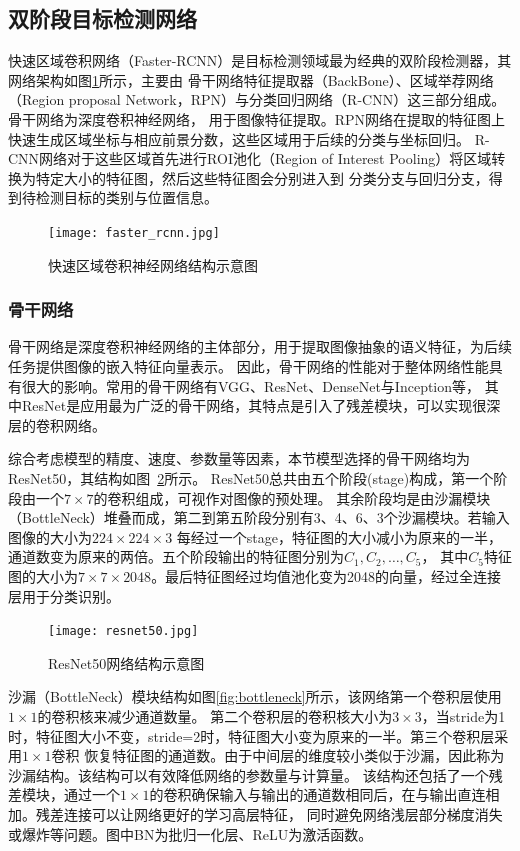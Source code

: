 \subsection{双阶段目标检测网络}
\label{section:faster-rcnn}
快速区域卷积网络（Faster-RCNN）是目标检测领域最为经典的双阶段检测器，其网络架构如图\ref{fig:faster_rcnn}所示，主要由
骨干网络特征提取器（BackBone）、区域举荐网络（Region proposal Network，RPN）与分类回归网络（R-CNN）这三部分组成。骨干网络为深度卷积神经网络，
用于图像特征提取。RPN网络在提取的特征图上快速生成区域坐标与相应前景分数，这些区域用于后续的分类与坐标回归。
R-CNN网络对于这些区域首先进行ROI池化（Region of Interest Pooling）将区域转换为特定大小的特征图，然后这些特征图会分别进入到
分类分支与回归分支，得到待检测目标的类别与位置信息。

\begin{figure}  
   \centering   
   \texttt{[image: faster\_rcnn.jpg]}   
   \caption{快速区域卷积神经网络结构示意图}   
   \label{fig:faster_rcnn} 
\end{figure}  

\subsubsection{骨干网络}
骨干网络是深度卷积神经网络的主体部分，用于提取图像抽象的语义特征，为后续任务提供图像的嵌入特征向量表示。
因此，骨干网络的性能对于整体网络性能具有很大的影响。常用的骨干网络有VGG、ResNet、DenseNet与Inception等，
其中ResNet是应用最为广泛的骨干网络，其特点是引入了残差模块，可以实现很深层的卷积网络。

综合考虑模型的精度、速度、参数量等因素，本节模型选择的骨干网络均为ResNet50，其结构如图~\ref{fig:resnet50}所示。
ResNet50总共由五个阶段(stage)构成，第一个阶段由一个$7\times7$的卷积组成，可视作对图像的预处理。
其余阶段均是由沙漏模块（BottleNeck）堆叠而成，第二到第五阶段分别有3、4、6、3个沙漏模块。若输入图像的大小为$224\times224\times3$
每经过一个stage，特征图的大小减小为原来的一半，通道数变为原来的两倍。五个阶段输出的特征图分别为$C_1, C_2, \dots, C_5$，
其中$C_5$特征图的大小为$7\times7\times2048$。最后特征图经过均值池化变为2048的向量，经过全连接层用于分类识别。

\begin{figure}      
  \centering       
  \texttt{[image: resnet50.jpg]}       
  \caption{ResNet50网络结构示意图}       
  \label{fig:resnet50}  
\end{figure}   

沙漏（BottleNeck）模块结构如图\ref{fig:bottleneck}所示，该网络第一个卷积层使用$1\times1$的卷积核来减少通道数量。
第二个卷积层的卷积核大小为$3\times3$，当stride为1时，特征图大小不变，stride=2时，特征图大小变为原来的一半。第三个卷积层采用$1\times1$卷积
恢复特征图的通道数。由于中间层的维度较小类似于沙漏，因此称为沙漏结构。该结构可以有效降低网络的参数量与计算量。
该结构还包括了一个残差模块，通过一个$1\times1$的卷积确保输入与输出的通道数相同后，在与输出直连相加。残差连接可以让网络更好的学习高层特征，
同时避免网络浅层部分梯度消失或爆炸等问题。图中BN为批归一化层、ReLU为激活函数。

